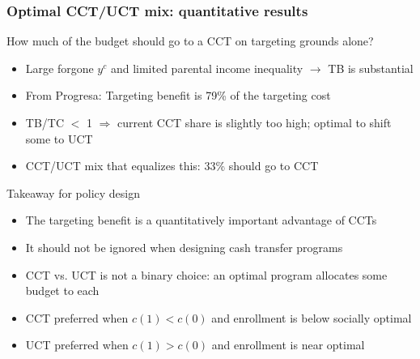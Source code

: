 \documentclass[aspectratio=169]{beamer}
\begin{document}
\begin{frame}
  \frametitle{Optimal CCT/UCT mix: quantitative results}
  How much of the budget should go to a CCT on targeting grounds alone?
\begin{itemize}\setlength\itemsep{3pt}
\item Large forgone $y^c$ and limited parental income inequality $\to$ TB is substantial
\item From Progresa: Targeting benefit is 79\% of the targeting cost 
\item TB/TC $<$ 1 $\Rightarrow$ current CCT share is slightly too high; optimal to shift some to UCT
\item CCT/UCT mix that equalizes this: 33\% should go to CCT
\end{itemize}\medskip
Takeaway for policy design
\begin{itemize}\setlength\itemsep{3pt}
\item The targeting benefit is a quantitatively important advantage of CCTs \item It should not be ignored when designing cash transfer programs
\item CCT vs. UCT is not a binary choice: an optimal program allocates some budget to each
\item CCT preferred when $c(1) < c(0)$ and enrollment is below socially optimal
\item UCT preferred when $c(1) > c(0)$ and enrollment is near optimal
\end{itemize}
\end{frame}
\end{document}
